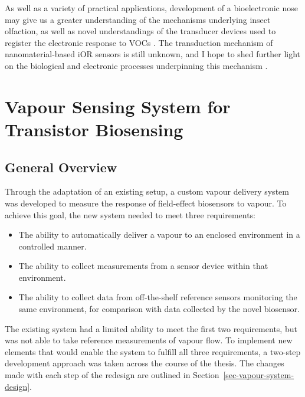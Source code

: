 \documentclass[
  a4paper,
]{scrbook}
\begin{document}
As well as a variety of practical applications, development of a
bioelectronic nose may give us a greater understanding of the mechanisms
underlying insect olfaction, as well as novel understandings of the
transducer devices used to register the electronic response to VOCs
\autocite{Lee2010}. The transduction mechanism of nanomaterial-based iOR
sensors is still unknown, and I hope to shed further light on the
biological and electronic processes underpinning this mechanism
\autocite{Murugathas2020,Khadka2019}.


\hypertarget{sec-vapour-sensing-biosensors}{%
\chapter{Vapour Sensing System for Transistor
Biosensing}\label{sec-vapour-sensing-biosensors}}

\hypertarget{general-overview}{%
\section{General Overview}\label{general-overview}}

Through the adaptation of an existing setup, a custom vapour delivery
system was developed to measure the response of field-effect biosensors
to vapour. To achieve this goal, the new system needed to meet three
requirements:

\begin{itemize}
\item
  The ability to automatically deliver a vapour to an enclosed
  environment in a controlled manner.
\item
  The ability to collect measurements from a sensor device within that
  environment.
\item
  The ability to collect data from off-the-shelf reference sensors
  monitoring the same environment, for comparison with data collected by
  the novel biosensor.
\end{itemize}

The existing system had a limited ability to meet the first two
requirements, but was not able to take reference measurements of vapour
flow. To implement new elements that would enable the system to fulfill
all three requirements, a two-step development approach was taken across
the course of the thesis. The changes made with each step of the
redesign are outlined in Section~\ref{sec-vapour-system-design}.
\end{document}
